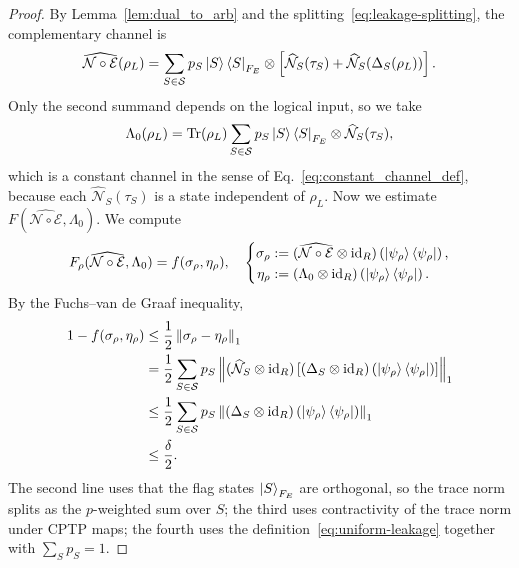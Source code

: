 \documentclass[10pt,twocolumn,superscriptaddress,aps,amsmath,amssymb,citeautoscript,floatfix,prx]{revtex4-2}
\theoremstyle{plain}
\theoremstyle{plain}
\theoremstyle{plain}
\theoremstyle{plain}
\theoremstyle{plain}
\theoremstyle{plain}
\theoremstyle{plain}
\theoremstyle{definition}
\theoremstyle{plain}
\begin{document}
\begin{appendix}
\begin{proof}
    By Lemma~\ref{lem:dual_to_arb} and the splitting~\eqref{eq:leakage-splitting}, the complementary channel is
    \[
        \widehat{\mathcal N\circ\mathcal E}(\rho_L)
        =
        \sum_{S\in\mathcal S}
        p_S
        \ket S\bra S_{F_E}
        \otimes
        \left[
            \widehat{\mathcal N}_S(\tau_S)
            +
            \widehat{\mathcal N}_S(\Delta_S(\rho_L))
        \right].
    \]
    Only the second summand depends on the logical input, so we take
    \[
        \Lambda_0(\rho_L)
        =
        \operatorname{Tr}(\rho_L)
        \sum_{S\in\mathcal S}
        p_S
        \ket S\bra S_{F_E}
        \otimes
        \widehat{\mathcal N}_S(\tau_S),
    \]
    which is a constant channel in the sense of Eq.~\eqref{eq:constant_channel_def}, because each $\widehat{\mathcal N}_S(\tau_S)$ is a state independent of $\rho_L$. 
    Now we estimate $F(\widehat{\mathcal N\circ\mathcal E},\Lambda_0)$.  We compute
    \[
        F_\rho(\widehat{\mathcal N\circ\mathcal E},\Lambda_0)
        =
        f(\sigma_\rho,\eta_\rho),
        \quad
        \left\{
        \begin{aligned}
        \sigma_\rho
        &:=
        (\widehat{\mathcal N\circ\mathcal E}\otimes \mathrm{id}_R)
        \left(\ket{\psi_\rho}\bra{\psi_\rho}\right),\\
        \eta_\rho
        &:=
        (\Lambda_0\otimes \mathrm{id}_R)
        \left(\ket{\psi_\rho}\bra{\psi_\rho}\right).
        \end{aligned}
        \right.
    \]
    By the Fuchs--van de Graaf inequality,
    \[
    \begin{aligned}
    1-f(\sigma_\rho,\eta_\rho)
    &\leq
    \frac{1}{2}
    \left\|
        \sigma_\rho-\eta_\rho
    \right\|_1
    \\
    &=
    \frac{1}{2}
    \sum_{S\in\mathcal S}
    p_S
    \left\|
    (\widehat{\mathcal N}_S\otimes \mathrm{id}_R)
    \left[
        (\Delta_S\otimes \mathrm{id}_R)
        \left(\ket{\psi_\rho}\bra{\psi_\rho}\right)
    \right]
    \right\|_1
    \\
    &\leq
    \frac{1}{2}
    \sum_{S\in\mathcal S}
    p_S
    \left\|
        (\Delta_S\otimes \mathrm{id}_R)
        \left(\ket{\psi_\rho}\bra{\psi_\rho}\right)
    \right\|_1
    \\
    &\leq
    \frac{\delta}{2}.
    \end{aligned}
    \]
    The second line uses that the flag states $\ket S_{F_E}$ are orthogonal, so the trace norm splits as the $p$-weighted sum over $S$; 
    the third uses contractivity of the trace norm under CPTP maps; the fourth uses the definition~\eqref{eq:uniform-leakage} together with $\sum_Sp_S=1$.


\end{proof}
\end{appendix}
\end{document}
